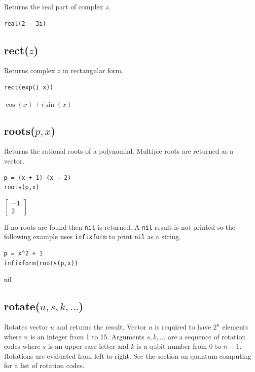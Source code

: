 \documentclass[12pt]{article}
\begin{document}
Returns the real part of complex $z$.

{\color{blue}
\begin{verbatim}
real(2 - 3i)
\end{verbatim}
}


\subsection*{rect($z$)}

Returns complex $z$ in rectangular form.

{\color{blue}
\begin{verbatim}
rect(exp(i x))
\end{verbatim}
}

\noindent
$\displaystyle \cos(x)+i\sin(x)$

\subsection*{roots($p,x$)}

Returns the rational roots of a polynomial.
Multiple roots are returned as a vector.

{\color{blue}
\begin{verbatim}
p = (x + 1) (x - 2)
roots(p,x)
\end{verbatim}
}

\noindent
$\displaystyle
\begin{bmatrix}
-1
\\[1ex]
2
\end{bmatrix}
$

\bigskip
\noindent
If no roots are found then \verb$nil$ is returned.
A \verb$nil$ result is not printed so the following example uses
\verb$infixform$ to print \verb$nil$ as a string.

{\color{blue}
\begin{verbatim}
p = x^2 + 1
infixform(roots(p,x))
\end{verbatim}
}

\noindent
nil

\subsection*{rotate($u,s,k,\ldots$)}
Rotates vector $u$ and returns the result.
Vector $u$ is required to have $2^n$ elements where
$n$ is an integer from 1 to 15.
Arguments $s,k,\ldots$ are a sequence of rotation codes
where $s$ is an upper case letter and $k$ is a qubit number
from 0 to $n-1$.
Rotations are evaluated from left to right.
See the section on quantum computing for a list of rotation codes.
\end{document}
